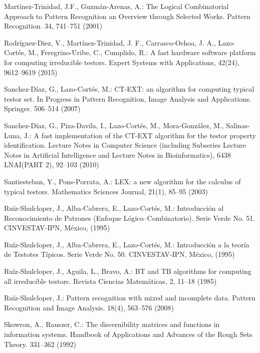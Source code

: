 \documentclass[citeauthoryear]{llncs}
\begin{document}
\begin{thebibliography}{}
	Mart\'inez-Trinidad, J.F., Guzm\'an-Arenas, A.: 
	The Logical Combinatorial Approach to Pattern Recognition an Overview through Selected Works. 
	Pattern Recognition. 34, 741--751 (2001)

	Rodríguez-Diez, V., Martínez-Trinidad, J. F., Carrasco-Ochoa, J. A., Lazo-Cortés, M., Feregrino-Uribe, C., Cumplido, R.:
	A fast hardware software platform for computing irreducible testors. 
	Expert Systems with Applications, 
	42(24), 9612–9619 (2015)

	Sanchez-D\'iaz, G., Lazo-Cort\'es, M.:
	CT-EXT: an algorithm for computing typical testor set. 
	In Progress in Pattern Recognition, Image Analysis and Applications. Springer. 506--514 (2007)

	Sanchez-D\'iaz, G., Piza-Davila, I., Lazo-Cort\'es, M., Mora-Gonz\'alez, M., Salinas-Luna, J.:
	A fast implementation of the CT-EXT algorithm for the testor property identification. 
	Lecture Notes in Computer Science (including Subseries Lecture Notes in Artificial Intelligence and 
	Lecture	Notes in Bioinformatics), 6438 LNAI(PART 2), 92--103 (2010)

	Santiesteban, Y., Pons-Porrata, A.:
	LEX: a new algorithm for the calculus of typical testors. 
	Mathematics Sciences Journal, 21(1), 85--95 (2003)

	Ruíz-Shulcloper, J., Alba-Cabrera, E., Lazo-Cort\'es, M.:
	Introducci\'{o}n al Reconocimiento de Patrones (Enfoque L\'{o}gico--Combinatorio). 
	Serie Verde No. 51. CINVESTAV-IPN, México, (1995)

	Ruíz-Shulcloper, J., Alba-Cabrera, E., Lazo-Cort\'es, M.:
	Introducci\'{o}n a la teor\'ia de Testotes T\'ipicos. 
	Serie Verde No. 50. CINVESTAV-IPN, México, (1995)
	
	Ruíz-Shulcloper, J., Aguila, L., Bravo, A.:
	BT and TB algorithms for computing all irreducible testors. 
	Revista Ciencias Matem\'{a}ticas, 2, 11--18 (1985)

	Ruíz-Shulcloper, J.:
	Pattern recognition with mixed and incomplete data. 
	Pattern Recognition and Image Analysis. 18(4), 563--576 (2008)

	Skowron, A., Rauszer, C.:
	The discernibility matrices and functions in information systems. 
	Handbook of Applications and Advances of the Rough Sets Theory. 331--362  (1992)
	
	
\end{thebibliography}

%
\end{document}
